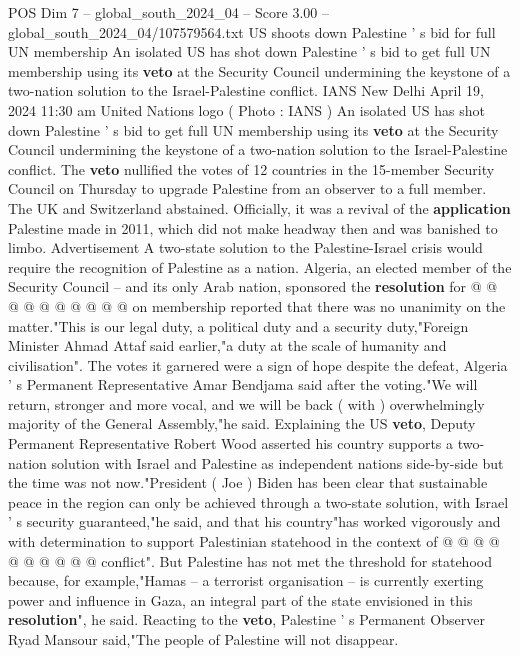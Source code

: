 \begin{textsample}{POS Dim 7 – global\_south\_2024\_04 – Score 3.00 – global\_south\_2024\_04/107579564.txt}  \label{ex:f7_pos_104}
US shoots down Palestine ' s bid for full UN membership An isolated US has shot down Palestine ' s bid to get full UN membership using its \textbf{veto} at the Security Council undermining the keystone of a two-nation solution to the Israel-Palestine conflict.
IANS New Delhi April 19, 2024 11:30 am United Nations logo ( Photo : IANS ) An isolated US has shot down Palestine ' s bid to get full UN membership using its \textbf{veto} at the Security Council undermining the keystone of a two-nation solution to the Israel-Palestine conflict.
The \textbf{veto} nullified the votes of 12 countries in the 15-member Security Council on Thursday to upgrade Palestine from an observer to a full member.
The UK and Switzerland abstained.
Officially, it was a revival of the \textbf{application} Palestine made in 2011, which did not make headway then and was banished to limbo.
Advertisement A two-state solution to the Palestine-Israel crisis would require the recognition of Palestine as a nation.
Algeria, an elected member of the Security Council -- and its only Arab nation, sponsored the \textbf{resolution} for @ @ @ @ @ @ @ @ @ @ on membership reported that there was no unanimity on the matter."This is our legal duty, a political duty and a security duty,"Foreign Minister Ahmad Attaf said earlier,"a duty at the scale of humanity and civilisation".
The votes it garnered were a sign of hope despite the defeat, Algeria ' s Permanent Representative Amar Bendjama said after the voting."We will return, stronger and more vocal, and we will be back ( with ) overwhelmingly majority of the General Assembly,"he said.
Explaining the US \textbf{veto}, Deputy Permanent Representative Robert Wood asserted his country supports a two-nation solution with Israel and Palestine as independent nations side-by-side but the time was not now."President ( Joe ) Biden has been clear that sustainable peace in the region can only be achieved through a two-state solution, with Israel ' s security guaranteed,"he said, and that his country"has worked vigorously and with determination to support Palestinian statehood in the context of @ @ @ @ @ @ @ @ @ @ conflict".
But Palestine has not met the threshold for statehood because, for example,"Hamas -- a terrorist organisation -- is currently exerting power and influence in Gaza, an integral part of the state envisioned in this \textbf{resolution}", he said.
Reacting to the \textbf{veto}, Palestine ' s Permanent Observer Ryad Mansour said,"The people of Palestine will not disappear.

\end{textsample}
